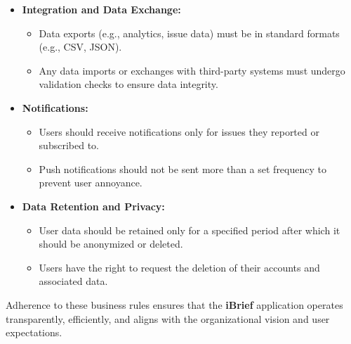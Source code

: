 \begin{itemize}
    \item \textbf{Integration and Data Exchange:}
    \begin{itemize}
        \item Data exports (e.g., analytics, issue data) must be in standard formats (e.g., CSV, JSON).
        \item Any data imports or exchanges with third-party systems must undergo validation checks to ensure data integrity.
    \end{itemize}

    \item \textbf{Notifications:}
    \begin{itemize}
        \item Users should receive notifications only for issues they reported or subscribed to.
        \item Push notifications should not be sent more than a set frequency to prevent user annoyance.
    \end{itemize}

    \item \textbf{Data Retention and Privacy:}
    \begin{itemize}
        \item User data should be retained only for a specified period after which it should be anonymized or deleted.
        \item Users have the right to request the deletion of their accounts and associated data.
    \end{itemize}

\end{itemize}

Adherence to these business rules ensures that the \textbf{iBrief} application operates transparently, efficiently, and aligns with the organizational vision and user expectations.
